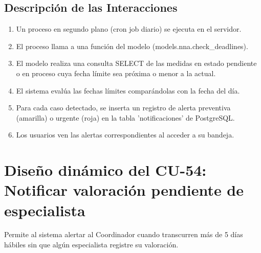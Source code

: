 \subsection{Descripción de las Interacciones}
\begin{enumerate}
    \item Un proceso en segundo plano (cron job diario) se ejecuta en el servidor.
    \item El proceso llama a una función del modelo (models.nna.check\_deadlines).
    \item El modelo realiza una consulta SELECT de las medidas en estado pendiente o en proceso cuya fecha límite sea próxima o menor a la actual.
    \item El sistema evalúa las fechas límites comparándolas con la fecha del día.
    \item Para cada caso detectado, se inserta un registro de alerta preventiva (amarilla) o urgente (roja) en la tabla 'notificaciones' de PostgreSQL.
    \item Los usuarios ven las alertas correspondientes al acceder a su bandeja.
\end{enumerate}

\cleardoublepage
\section{Diseño dinámico del CU-54: Notificar valoración pendiente de especialista}
\label{sec:disenoDinamicoCU54}

Permite al sistema alertar al Coordinador cuando transcurren más de 5 días hábiles sin que algún especialista registre su valoración.

